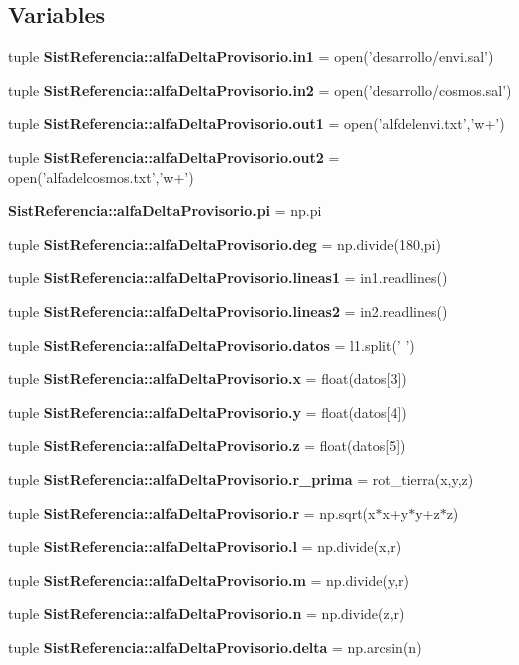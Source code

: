 \subsection*{\-Variables}
\begin{DoxyCompactItemize}
\item 
tuple {\bf \-Sist\-Referencia\-::alfa\-Delta\-Provisorio.\-in1} = open('desarrollo/envi.\-sal')
\item 
tuple {\bf \-Sist\-Referencia\-::alfa\-Delta\-Provisorio.\-in2} = open('desarrollo/cosmos.\-sal')
\item 
tuple {\bf \-Sist\-Referencia\-::alfa\-Delta\-Provisorio.\-out1} = open('alfdelenvi.\-txt','w+')
\item 
tuple {\bf \-Sist\-Referencia\-::alfa\-Delta\-Provisorio.\-out2} = open('alfadelcosmos.\-txt','w+')
\item 
{\bf \-Sist\-Referencia\-::alfa\-Delta\-Provisorio.\-pi} = np.\-pi
\item 
tuple {\bf \-Sist\-Referencia\-::alfa\-Delta\-Provisorio.\-deg} = np.\-divide(180,pi)
\item 
tuple {\bf \-Sist\-Referencia\-::alfa\-Delta\-Provisorio.\-lineas1} = in1.\-readlines()
\item 
tuple {\bf \-Sist\-Referencia\-::alfa\-Delta\-Provisorio.\-lineas2} = in2.\-readlines()
\item 
tuple {\bf \-Sist\-Referencia\-::alfa\-Delta\-Provisorio.\-datos} = l1.\-split(' ')
\item 
tuple {\bf \-Sist\-Referencia\-::alfa\-Delta\-Provisorio.\-x} = float(datos[3])
\item 
tuple {\bf \-Sist\-Referencia\-::alfa\-Delta\-Provisorio.\-y} = float(datos[4])
\item 
tuple {\bf \-Sist\-Referencia\-::alfa\-Delta\-Provisorio.\-z} = float(datos[5])
\item 
tuple {\bf \-Sist\-Referencia\-::alfa\-Delta\-Provisorio.\-r\-\_\-prima} = rot\-\_\-tierra(x,y,z)
\item 
tuple {\bf \-Sist\-Referencia\-::alfa\-Delta\-Provisorio.\-r} = np.\-sqrt(x$\ast$x+y$\ast$y+z$\ast$z)
\item 
tuple {\bf \-Sist\-Referencia\-::alfa\-Delta\-Provisorio.\-l} = np.\-divide(x,r)
\item 
tuple {\bf \-Sist\-Referencia\-::alfa\-Delta\-Provisorio.\-m} = np.\-divide(y,r)
\item 
tuple {\bf \-Sist\-Referencia\-::alfa\-Delta\-Provisorio.\-n} = np.\-divide(z,r)
\item 
tuple {\bf \-Sist\-Referencia\-::alfa\-Delta\-Provisorio.\-delta} = np.\-arcsin(n)

\end{DoxyCompactItemize}
